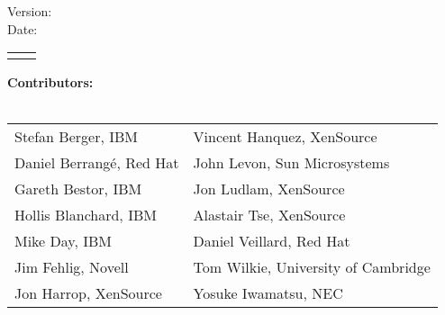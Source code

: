 %
%
%
%

\pagestyle{empty}

\doctitle{} \hfill \revstring{}

\vspace{1cm}

\begin{center}

\vspace{2cm}

\begin{Huge}
  \doctitle{}
\end{Huge}

\vspace{1cm}
\begin{Large}
Version: \revstring{}\\
Date: \datestring{}
\\
\releasestatement{}

\vspace{1cm}
\begin{tabular}{rl}
\docauthors{}
\end{tabular}
\end{Large}
\end{center}
\vspace{.5cm}
\begin{large}
\textbf{Contributors:} \\
\\
\begin{tabular}{p{}l}
Stefan Berger, IBM & Vincent Hanquez, XenSource \\
Daniel Berrang\'e, Red Hat & John Levon, Sun Microsystems \\
Gareth Bestor, IBM & Jon Ludlam, XenSource \\
Hollis Blanchard, IBM & Alastair Tse, XenSource \\
Mike Day, IBM & Daniel Veillard, Red Hat \\
Jim Fehlig, Novell & Tom Wilkie, University of Cambridge \\
Jon Harrop, XenSource & Yosuke Iwamatsu, NEC \\
\end{tabular}
\end{large}

\vfill

\noindent
\legalnotice{}

\newpage
\pagestyle{fancy}
